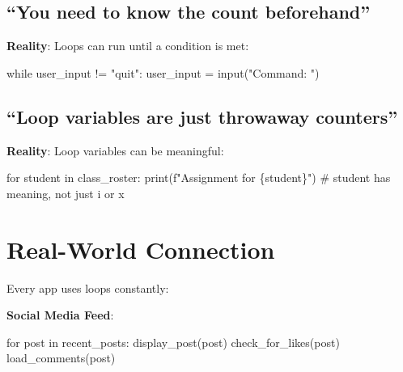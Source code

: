 \documentclass[
  letterpaper,
  DIV=11,
  numbers=noendperiod,
  oneside]{scrreprt}
\newenvironment{Shaded}{}{}
\newcommand{\BuiltInTok}[1]{\textcolor[rgb]{0.84,0.23,0.29}{#1}}
\newcommand{\CommentTok}[1]{\textcolor[rgb]{0.42,0.45,0.49}{#1}}
\newcommand{\ControlFlowTok}[1]{\textcolor[rgb]{0.84,0.23,0.29}{#1}}
\newcommand{\KeywordTok}[1]{\textcolor[rgb]{0.84,0.23,0.29}{#1}}
\newcommand{\NormalTok}[1]{\textcolor[rgb]{0.14,0.16,0.18}{#1}}
\newcommand{\OperatorTok}[1]{\textcolor[rgb]{0.14,0.16,0.18}{#1}}
\newcommand{\SpecialCharTok}[1]{\textcolor[rgb]{0.00,0.36,0.77}{#1}}
\newcommand{\SpecialStringTok}[1]{\textcolor[rgb]{0.01,0.18,0.38}{#1}}
\newcommand{\StringTok}[1]{\textcolor[rgb]{0.01,0.18,0.38}{#1}}
\begin{document}
\subsection{``You need to know the count
beforehand''}\label{you-need-to-know-the-count-beforehand}

\textbf{Reality}: Loops can run until a condition is met:

\begin{Shaded}
\begin{Highlighting}[]
\ControlFlowTok{while}\NormalTok{ user\_input }\OperatorTok{!=} \StringTok{"quit"}\NormalTok{:}
\NormalTok{    user\_input }\OperatorTok{=} \BuiltInTok{input}\NormalTok{(}\StringTok{"Command: "}\NormalTok{)}
\end{Highlighting}
\end{Shaded}

\subsection{``Loop variables are just throwaway
counters''}\label{loop-variables-are-just-throwaway-counters}

\textbf{Reality}: Loop variables can be meaningful:

\begin{Shaded}
\begin{Highlighting}[]
\ControlFlowTok{for}\NormalTok{ student }\KeywordTok{in}\NormalTok{ class\_roster:}
    \BuiltInTok{print}\NormalTok{(}\SpecialStringTok{f"Assignment for }\SpecialCharTok{\{}\NormalTok{student}\SpecialCharTok{\}}\SpecialStringTok{"}\NormalTok{)}
\CommentTok{\# \textquotesingle{}student\textquotesingle{} has meaning, not just \textquotesingle{}i\textquotesingle{} or \textquotesingle{}x\textquotesingle{}}
\end{Highlighting}
\end{Shaded}

\section{Real-World Connection}\label{real-world-connection-4}

Every app uses loops constantly:

\textbf{Social Media Feed}:

\begin{Shaded}
\begin{Highlighting}[]
\ControlFlowTok{for}\NormalTok{ post }\KeywordTok{in}\NormalTok{ recent\_posts:}
\NormalTok{    display\_post(post)}
\NormalTok{    check\_for\_likes(post)}
\NormalTok{    load\_comments(post)}
\end{Highlighting}
\end{Shaded}
\end{document}
